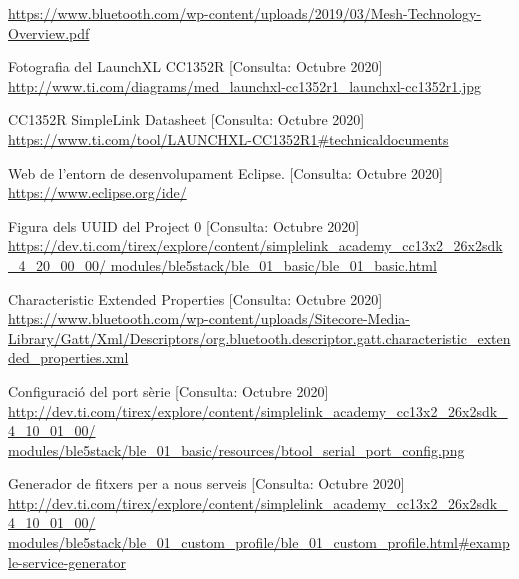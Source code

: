 \begin{thebibliography}{2}
\href{https://www.bluetooth.com/wp-content/uploads/2019/03/Mesh-Technology-Overview.pdf}{https://www.bluetooth.com/wp-content/uploads/2019/03/Mesh-Technology-Overview.pdf}

Fotografia del LaunchXL CC1352R
[Consulta: Octubre 2020]\newline
\href{http://www.ti.com/diagrams/med_launchxl-cc1352r1_launchxl-cc1352r1.jpg}{http://www.ti.com/diagrams/med\_launchxl-cc1352r1\_launchxl-cc1352r1.jpg}

CC1352R SimpleLink Datasheet
[Consulta: Octubre 2020]\newline
\href{https://www.ti.com/tool/LAUNCHXL-CC1352R1\#technicaldocuments}{https://www.ti.com/tool/LAUNCHXL-CC1352R1\#technicaldocuments}

Web de l'entorn de desenvolupament Eclipse.
[Consulta: Octubre 2020] \newline
\href{https://www.eclipse.org/ide/}{https://www.eclipse.org/ide/}

Figura dels UUID del Project 0 [Consulta: Octubre 2020]\newline
\href{https://dev.ti.com/tirex/explore/content/simplelink_academy_cc13x2_26x2sdk_4_20_00_00/modules/ble5stack/ble_01_basic/ble_01_basic.html}{https://dev.ti.com/tirex/explore/content/simplelink\_academy\_cc13x2\_26x2sdk\_4\_20\_00\_00/ modules/ble5stack/ble\_01\_basic/ble\_01\_basic.html}


Characteristic Extended Properties
[Consulta: Octubre 2020]\newline
\href{https://www.bluetooth.com/wp-content/uploads/Sitecore-Media-Library/Gatt/Xml/Descriptors/org.bluetooth.descriptor.gatt.characteristic_extended_properties.xml}{https://www.bluetooth.com/wp-content/uploads/Sitecore-Media-Library/Gatt/Xml/Descriptors/org.bluetooth.descriptor.gatt.characteristic\_extended\_properties.xml}

Configuració del port sèrie
[Consulta: Octubre 2020] \newline
\href{http://dev.ti.com/tirex/explore/content/simplelink_academy_cc13x2_26x2sdk_4_10_01_00/modules/ble5stack/ble_01\_basic/resources/btool_serial_port_config.png}{http://dev.ti.com/tirex/explore/content/simplelink\_academy\_cc13x2\_26x2sdk\_4\_10\_01\_00/ modules/ble5stack/ble\_01\_basic/resources/btool\_serial\_port\_config.png}

Generador de fitxers per a nous serveis 
[Consulta: Octubre 2020] \newline
\href{http://dev.ti.com/tirex/explore/content/simplelink\_academy\_cc13x2\_26x2sdk\_4\_10\_01\_00/modules/ble5stack/ble\_01\_custom\_profile/ble\_01\_custom\_profile.html\#example-service-generator}{http://dev.ti.com/tirex/explore/content/simplelink\_academy\_cc13x2\_26x2sdk\_4\_10\_01\_00/ modules/ble5stack/ble\_01\_custom\_profile/ble\_01\_custom\_profile.html\#example-service-generator}


\end{thebibliography}
